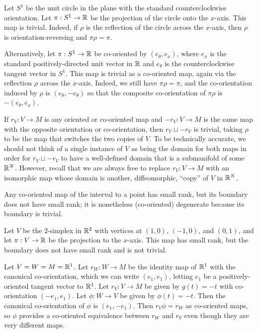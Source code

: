 \begin{example}
Let $S^1$ be the unit circle in the plane with the standard counterclockwise orientation. Let $\pi: S^1 \to \mathbb{R}$ be the projection of the circle onto the $x$-axis. This map is trivial. Indeed, if $\rho$ is the reflection of the circle across the $x$-axis, then $\rho$ is orientation-reversing and $\pi \rho = \pi$.

Alternatively, let $\pi:S^1 \to \mathbb{R}$ be co-oriented by $(e_\theta,e_x)$, where $e_x$ is the standard positively-directed unit vector in $\mathbb{R}$ and $e_\theta$ is the counterclockwise tangent vector in $S^1$. This map is trivial as a co-oriented map, again via the reflection $\rho$ across the $x$-axis. Indeed, we still have $\pi \rho = \pi$, and the co-orientation induced by $\rho$ is $(e_\theta,-e_\theta)$ so that the composite co-orientation of $\pi\rho$ is $-(e_\theta,e_x)$.
\end{example}

\begin{example}
If $r_V:V \to M$ is any oriented or co-oriented map and $-r_V:V \to M$ is the same map with the opposite orientation or co-orientation, then $r_V \sqcup -r_V$ is trivial, taking $\rho$ to be the map that switches the two copies of $V$. To be technically accurate, we should not think of a single instance of $V$ as being the domain for both maps in order for $r_V \sqcup -r_V$ to have a well-defined domain that is a submanifold of some $\mathbb{R}^N$. However, recall that we are always free to replace $r_V:V \to M$ with an isomorphic map whose domain is another, diffeomorphic, ``copy'' of $V$ in $\mathbb{R}^N$.
\end{example}



\begin{example}
Any co-oriented map of the interval to a point has small rank, but its boundary does not have small rank; it is nonetheless (co-oriented) degenerate because its boundary is trivial.
\end{example}

\begin{example}\label{E: projected triangle}
Let $V$ be the $2$-simplex in $\mathbb{R}^2$ with vertices at $(1,0)$, $(-1,0)$, and $(0,1)$, and let $\pi:V \to \mathbb{R}$ be the projection to the $x$-axis. This map has small rank, but the boundary does not have small rank and is not trivial.
\end{example}


\begin{example}
Let $V = W = M = \mathbb{R}^1$. Let $r_W \colon W \to M$ be the identity map of $\mathbb{R}^1$ with the canonical co-orientation, which we can write $(e_1,e_1)$, letting $e_1$ be a positively-oriented tangent vector to $\mathbb{R}^1$. Let $r_V:V \to M$ be given by $g(t) = -t$ with co-orientation $(-e_1,e_1)$. Let $\phi:W \to V$ be given by $\phi(t) = -t$. Then the canonical co-orientation of $\phi$ is $(e_1,-e_1)$. Then $r_V\phi = r_W$ as co-oriented maps, so $\phi$ provides a co-oriented equivalence between $r_W$ and $r_V$ even though they are very different maps.
\end{example}



